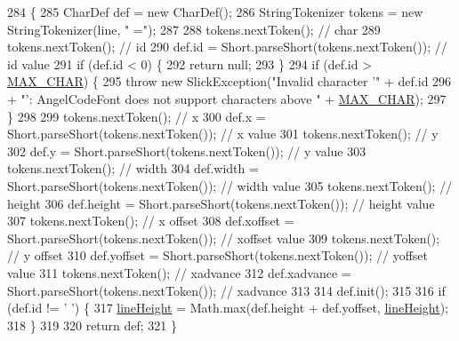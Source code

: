 \begin{DoxyCode}
284                                                                  \{
285         CharDef def = \textcolor{keyword}{new} CharDef();
286         StringTokenizer tokens = \textcolor{keyword}{new} StringTokenizer(line, \textcolor{stringliteral}{" ="});
287 
288         tokens.nextToken(); \textcolor{comment}{// char}
289         tokens.nextToken(); \textcolor{comment}{// id}
290         def.id = Short.parseShort(tokens.nextToken()); \textcolor{comment}{// id value}
291         \textcolor{keywordflow}{if} (def.id < 0) \{
292             \textcolor{keywordflow}{return} null;
293         \}
294         \textcolor{keywordflow}{if} (def.id > \mbox{\hyperlink{classorg_1_1newdawn_1_1slick_1_1_angel_code_font_ab0bebe07d0e5a16dbccf3e99c2229f1a}{MAX\_CHAR}}) \{
295             \textcolor{keywordflow}{throw} \textcolor{keyword}{new} SlickException(\textcolor{stringliteral}{"Invalid character '"} + def.id
296                 + \textcolor{stringliteral}{"': AngelCodeFont does not support characters above "} + 
      \mbox{\hyperlink{classorg_1_1newdawn_1_1slick_1_1_angel_code_font_ab0bebe07d0e5a16dbccf3e99c2229f1a}{MAX\_CHAR}});
297         \}
298 
299         tokens.nextToken(); \textcolor{comment}{// x}
300         def.x = Short.parseShort(tokens.nextToken()); \textcolor{comment}{// x value}
301         tokens.nextToken(); \textcolor{comment}{// y}
302         def.y = Short.parseShort(tokens.nextToken()); \textcolor{comment}{// y value}
303         tokens.nextToken(); \textcolor{comment}{// width}
304         def.width = Short.parseShort(tokens.nextToken()); \textcolor{comment}{// width value}
305         tokens.nextToken(); \textcolor{comment}{// height}
306         def.height = Short.parseShort(tokens.nextToken()); \textcolor{comment}{// height value}
307         tokens.nextToken(); \textcolor{comment}{// x offset}
308         def.xoffset = Short.parseShort(tokens.nextToken()); \textcolor{comment}{// xoffset value}
309         tokens.nextToken(); \textcolor{comment}{// y offset}
310         def.yoffset = Short.parseShort(tokens.nextToken()); \textcolor{comment}{// yoffset value}
311         tokens.nextToken(); \textcolor{comment}{// xadvance}
312         def.xadvance = Short.parseShort(tokens.nextToken()); \textcolor{comment}{// xadvance}
313 
314         def.init();
315 
316         \textcolor{keywordflow}{if} (def.id != \textcolor{charliteral}{' '}) \{
317             \mbox{\hyperlink{classorg_1_1newdawn_1_1slick_1_1_angel_code_font_a79b1b71568fb19eaed6dea5babc6e752}{lineHeight}} = Math.max(def.height + def.yoffset, \mbox{\hyperlink{classorg_1_1newdawn_1_1slick_1_1_angel_code_font_a79b1b71568fb19eaed6dea5babc6e752}{lineHeight}});
318         \}
319 
320         \textcolor{keywordflow}{return} def;
321     \}
\end{DoxyCode}
\mbox{\label{classorg_1_1newdawn_1_1slick_1_1_angel_code_font_a8950d304cfa460c9d2755900abda6c02}} 
